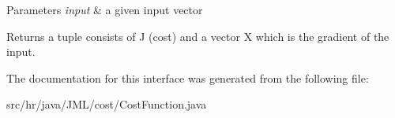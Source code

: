 \begin{DoxyParams}{Parameters}
{\em input} & a given input vector \\
\hline
\end{DoxyParams}
\begin{DoxyReturn}{Returns}
a tuple consists of J (cost) and a vector X which is the gradient of the input. 
\end{DoxyReturn}


The documentation for this interface was generated from the following file\+:\begin{DoxyCompactItemize}
\item 
src/hr/java/\+J\+M\+L/cost/Cost\+Function.\+java\end{DoxyCompactItemize}
